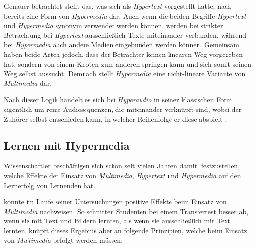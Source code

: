 Genauer betrachtet stellt das, was \cite{nelson1965complex} sich als \textit{Hypertext} vorgestellt hatte, nach \cite{nielsen2013multimedia} bereits eine Form von \textit{Hypermedia} dar. Auch wenn die beiden Begriffe \textit{Hypertext} und \textit{Hypermedia} synonym verwendet werden können, werden bei strikter Betrachtung bei \textit{Hypertext} ausschließlich Texte miteinander verbunden, während bei \textit{Hypermedia} auch andere Medien eingebunden werden können. Gemeinsam haben beide Arten jedoch, dass der Betrachter keinen linearen Weg vorgegeben hat, sondern von einem Knoten zum anderen springen kann und sich somit seinen Weg selbst aussucht. Demnach stellt \textit{Hypermedia} eine nicht-lineare Variante von \textit{Multimedia} dar.

Nach dieser Logik handelt es sich bei \textit{Hyperaudio} in seiner klassischen Form eigentlich um reine Audiosequenzen, die miteinander verknüpft sind, wobei der Zuhörer selbst entschieden kann, in welcher Reihenfolge er diese abspielt \citep{zumbach2006learning}.


\subsection{Lernen mit Hypermedia}
\label{sub:LernenMitHypermedia}
Wissenschaftler beschäftigen sich schon seit vielen Jahren damit, festzustellen, welche Effekte der Einsatz von \textit{Multimedia}, \textit{Hypertext} und \textit{Hypermedia} auf den Lernerfolg von Lernenden hat.


\cite{mayer2009multimedia} konnte im Laufe seiner Untersuchungen positive Effekte beim Einsatz von \textit{Multimedia} nachweisen. So schnitten Studenten bei einem Transfertest besser ab, wenn sie mit Text und Bildern lernten, als wenn sie ausschließlich mit Text lernten. \cite{mayer2009multimedia} knüpft dieses Ergebnis aber an folgende Prinzipien, welche beim Einsatz von \textit{Multimedia} befolgt werden müssen:

